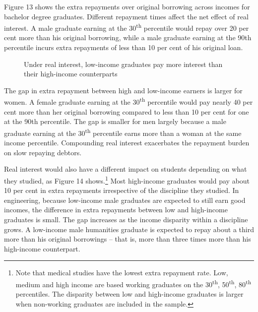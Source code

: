\documentclass[embargoed]{grattan}
\begin{document}
Figure 13 shows the extra repayments over original borrowing across incomes for bachelor degree graduates. Different repayment times affect the net effect of real interest. A male graduate earning at the 30\textsuperscript{th} percentile would repay over 20 per cent more than his original borrowing, while a male graduate earning at the 90th percentile incurs extra repayments of less than 10 per cent of his original loan.

\begin{figure}
\caption{Under real interest, low-income graduates pay more interest than their high-income counterparts}\label{fig:fig13-under-real-interest-low-income-grads-pay-more-interest-than-high-income-counterparts}


\end{figure}

The gap in extra repayment between high and low-income earners is larger for women. A female graduate earning at the 30\textsuperscript{th} percentile would pay nearly 40 per cent more than her original borrowing compared to less than 10 per cent for one at the 90th percentile. The gap is smaller for men largely because a male graduate earning at the 30\textsuperscript{th} percentile earns more than a woman at the same income percentile. Compounding real interest exacerbates the repayment burden on slow repaying debtors.

Real interest would also have a different impact on students depending on what they studied, as Figure 14 shows.\footnote{Note that medical studies have the lowest extra repayment rate. Low, medium and high income are based working graduates on the 30\textsuperscript{th}, 50\textsuperscript{th}, 80\textsuperscript{th} percentiles. The disparity between low and high-income graduates is larger when non-working graduates are included in the sample.} Most high-income graduates would pay about 10 per cent in extra repayments irrespective of the discipline they studied. In engineering, because low-income male graduates are expected to still earn good incomes, the difference in extra repayments between low and high-income graduates is small. The gap increases as the income disparity within a discipline grows. A low-income male humanities graduate is expected to repay about a third more than his original borrowings -- that is, more than three times more than his high-income counterpart.
\end{document}
